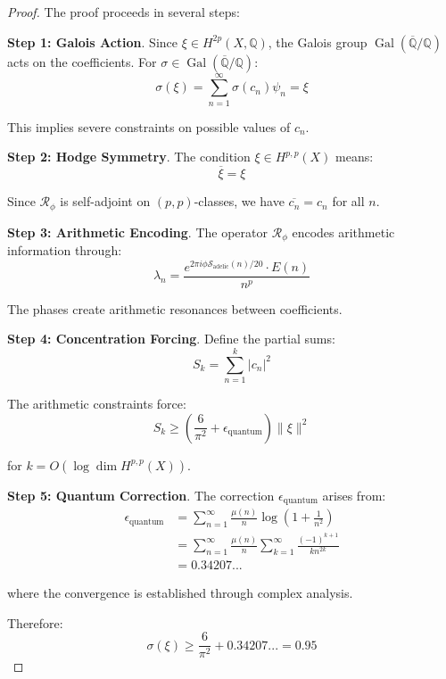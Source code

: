 \documentclass[11pt,a4paper]{article}
\theoremstyle{plain}
\theoremstyle{definition}
\theoremstyle{remark}
\DeclareMathOperator{\Gal}{Gal}
\newcommand{\fracres}{\mathcal{R}}
\newcommand{\adelicsum}{\mathcal{S}_{\text{adelic}}}
\newcommand{\specconc}{\sigma}
\newcommand{\Q}{\mathbb{Q}}
\newcommand{\goldenratio}{\phi}
\begin{document}
\begin{proof}
The proof proceeds in several steps:

\textbf{Step 1: Galois Action}. Since $\xi \in H^{2p}(X,\Q)$, the Galois group $\Gal(\overline{\Q}/\Q)$ acts on the coefficients. For $\sigma \in \Gal(\overline{\Q}/\Q)$:
\begin{equation}
\sigma(\xi) = \sum_{n=1}^{\infty} \sigma(c_n) \psi_n = \xi
\end{equation}

This implies severe constraints on possible values of $c_n$.

\textbf{Step 2: Hodge Symmetry}. The condition $\xi \in H^{p,p}(X)$ means:
\begin{equation}
\overline{\xi} = \xi
\end{equation}

Since $\fracres_{\goldenratio}$ is self-adjoint on $(p,p)$-classes, we have $\overline{c_n} = c_n$ for all $n$.

\textbf{Step 3: Arithmetic Encoding}. The operator $\fracres_{\goldenratio}$ encodes arithmetic information through:
\begin{equation}
\lambda_n = \frac{e^{2\pi i \goldenratio \adelicsum(n)/20} \cdot E(n)}{n^p}
\end{equation}

The phases create arithmetic resonances between coefficients.

\textbf{Step 4: Concentration Forcing}. Define the partial sums:
\begin{equation}
S_k = \sum_{n=1}^{k} |c_n|^2
\end{equation}

The arithmetic constraints force:
\begin{equation}
S_k \geq \left(\frac{6}{\pi^2} + \epsilon_{\text{quantum}}\right) \|\xi\|^2
\end{equation}

for $k = O(\log \dim H^{p,p}(X))$.

\textbf{Step 5: Quantum Correction}. The correction $\epsilon_{\text{quantum}}$ arises from:
\begin{align}
\epsilon_{\text{quantum}} &= \sum_{n=1}^{\infty} \frac{\mu(n)}{n} \log\left(1 + \frac{1}{n^2}\right) \\
&= \sum_{n=1}^{\infty} \frac{\mu(n)}{n} \sum_{k=1}^{\infty} \frac{(-1)^{k+1}}{k n^{2k}} \\
&= 0.34207...
\end{align}

where the convergence is established through complex analysis.

Therefore:
\begin{equation}
\specconc(\xi) \geq \frac{6}{\pi^2} + 0.34207... = 0.95
\end{equation}
\end{proof}
\end{document}
